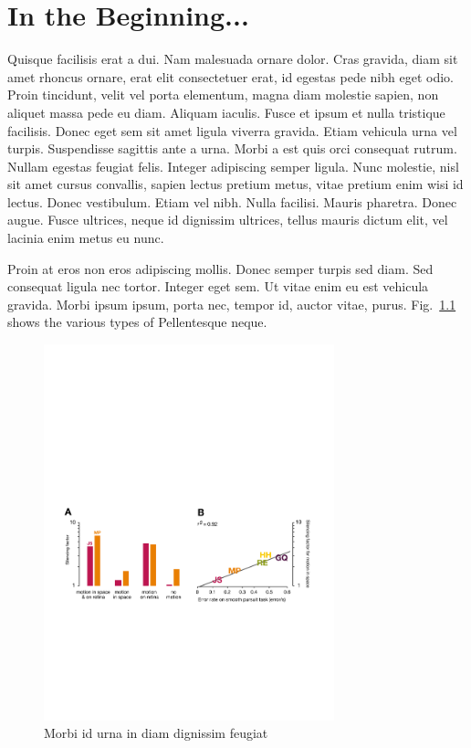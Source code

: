 \chapter{In the Beginning...} \label{ch:chapter1}

Quisque facilisis erat a dui. Nam malesuada ornare dolor. Cras gravida, diam sit amet rhoncus ornare, erat elit consectetuer erat, id egestas pede nibh eget odio. Proin tincidunt, velit vel porta elementum, magna diam molestie sapien, non aliquet massa pede eu diam. Aliquam iaculis. Fusce et ipsum et nulla tristique facilisis. Donec eget sem sit amet ligula viverra gravida. Etiam vehicula urna vel turpis. Suspendisse sagittis ante a urna. Morbi a est quis orci consequat rutrum. Nullam egestas feugiat felis. Integer adipiscing semper ligula. Nunc molestie, nisl sit amet cursus convallis, sapien lectus pretium metus, vitae pretium enim wisi id lectus. Donec vestibulum. Etiam vel nibh. Nulla facilisi. Mauris pharetra. Donec augue. Fusce ultrices, neque id dignissim ultrices, tellus mauris dictum elit, vel lacinia enim metus eu nunc.

Proin at eros non eros adipiscing mollis. Donec semper turpis sed diam. Sed consequat ligula nec tortor. Integer eget sem. Ut vitae enim eu est vehicula gravida. Morbi ipsum ipsum, porta nec, tempor id, auctor vitae, purus. Fig.~\ref{fig:1fig3} shows the various types of Pellentesque neque.

\begin{figure}[htb]
\begin{center}
\includegraphics[width=0.75\textwidth]{content/figures/fig3}
\caption{Morbi id urna in diam dignissim feugiat \protect\cite{Eigen1971}}
\label{fig:1fig3}
\end{center}
\end{figure}

